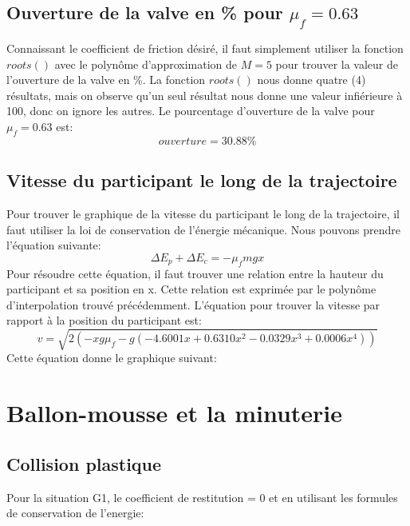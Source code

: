 \documentclass{article}
\begin{document}
\subsection{Ouverture de la valve en \% pour $\mu_f=0.63$}
Connaissant le coefficient de friction désiré, il faut simplement utiliser la fonction $roots()$ avec le polynôme d'approximation de $M=5$ pour trouver la valeur de l'ouverture de la valve en \%. La fonction $roots()$ nous donne quatre (4) résultats, mais on observe qu'un seul résultat nous donne une valeur infiérieure à 100, donc on ignore les autres. Le pourcentage d'ouverture de la valve pour $\mu_f=0.63$ est:
\begin{equation}
	ouverture = 30.88\%
\end{equation}

\subsection{Vitesse du participant le long de la trajectoire}
Pour trouver le graphique de la vitesse du participant le long de la trajectoire, il faut utiliser la loi de conservation de l'énergie mécanique. Nous pouvons prendre l'équation suivante:
\begin{equation}
	\Delta E_p + \Delta E_c = -\mu_fmgx
\end{equation}
Pour résoudre cette équation, il faut trouver une relation entre la hauteur du participant et sa position en x. Cette relation est exprimée par le polynôme d'interpolation trouvé précédemment. L'équation pour trouver la vitesse par rapport à la position du participant est:
\begin{equation}
	v = \sqrt{2(-xg\mu_f-g(-4.6001x+0.6310x^2-0.0329x^3+0.0006x^4))}
\end{equation}
Cette équation donne le graphique suivant:
\begin{center}
\end{center}

 
\section{Ballon-mousse et la minuterie}
\subsection{Collision plastique}
Pour la situation G1, le coefficient de restitution = 0 et en utilisant les formules de conservation de l'energie:
 
\end{document}
